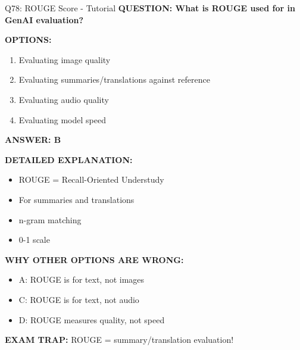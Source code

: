 \documentclass[8pt]{beamer}
\begin{document}
	\begin{frame}{Q78: ROUGE Score - Tutorial}
		\fontsize{6.5}{7.5}\selectfont
		\textbf{QUESTION: What is ROUGE used for in GenAI evaluation?}
		
		\vspace{0.1cm}
		\textbf{OPTIONS:}
		\begin{enumerate}
			\item Evaluating image quality
			\item Evaluating summaries/translations against reference
			\item Evaluating audio quality
			\item Evaluating model speed
		\end{enumerate}
		
		\vspace{0.1cm}
		\textcolor{myblue}{\textbf{ANSWER: B}}
		
		\vspace{0.1cm}
		\textbf{DETAILED EXPLANATION:}
		\begin{itemize}
			\item ROUGE = Recall-Oriented Understudy
			\item For summaries and translations
			\item n-gram matching
			\item 0-1 scale
		\end{itemize}
		
		\vspace{0.1cm}
		\textcolor{myred}{\textbf{WHY OTHER OPTIONS ARE WRONG:}}
		\begin{itemize}
			\item \textcolor{myred}{A:} ROUGE is for text, not images
			\item \textcolor{myred}{C:} ROUGE is for text, not audio
			\item \textcolor{myred}{D:} ROUGE measures quality, not speed
		\end{itemize}
		
		\textcolor{myred}{\textbf{EXAM TRAP:}} ROUGE = \textcolor{myblue}{summary/translation evaluation}!
	\end{frame}
	
\end{document}
